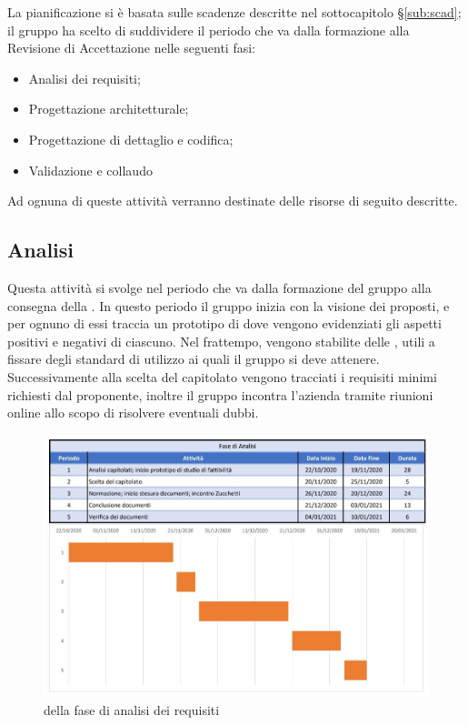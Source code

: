 \documentclass[../piano_di_progetto.tex]{subfiles}
\begin{document}
La pianificazione si è basata sulle scadenze descritte nel sottocapitolo \S\ref{sub:scad}; il gruppo ha scelto di suddividere il periodo che va dalla formazione alla Revisione di Accettazione nelle seguenti fasi:
\begin{itemize}
\item Analisi dei requisiti;
\item Progettazione architetturale;
\item Progettazione di dettaglio e codifica;
\item Validazione e collaudo
\end{itemize}
Ad ognuna di queste attività verranno destinate delle risorse di seguito descritte.


\subsection{Analisi}%
\label{sub:analisi}
Questa attività si svolge nel periodo che va dalla formazione del gruppo alla consegna della . In questo periodo il gruppo inizia con la visione dei  proposti, e per ognuno di essi traccia un prototipo di  dove vengono evidenziati gli aspetti positivi e negativi di ciascuno. Nel frattempo, vengono stabilite delle , utili a fissare degli standard di utilizzo ai quali il gruppo si deve attenere. Successivamente alla scelta del capitolato vengono tracciati i requisiti minimi richiesti dal proponente, inoltre il gruppo incontra l’azienda tramite riunioni online allo scopo di risolvere eventuali dubbi.\\

\begin{figure}[H]
\centering

\includegraphics[width=12cm]{componenti/img/fase_analisi}
\caption{  della fase di analisi dei requisiti}

\end{figure}
\end{document}
